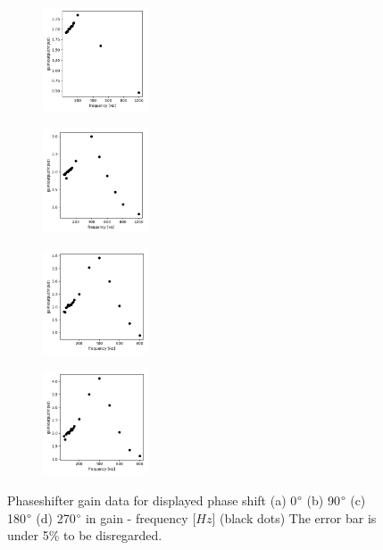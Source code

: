 \documentclass{article}
\begin{document}
\begin{figure}[H]
  \begin{subfigure}[b]{3.1cm}
      \centering
      \includegraphics[width=3.1cm]{../results/phaseshifter_gain_freq_plot(phase0).png}
      \caption{}
  \end{subfigure}
  \hfill
  \begin{subfigure}[b]{3.1cm}
    \centering
    \includegraphics[width=3.1cm]{../results/phaseshifter_gain_freq_plot(phase90).png}
    \caption{}
\end{subfigure}
\hfill
\begin{subfigure}[b]{3.1cm}
  \centering
  \includegraphics[width=3.1cm]{../results/phaseshifter_gain_freq_plot(phase180).png}
  \caption{}
\end{subfigure}
\hfill
\begin{subfigure}[b]{3.1cm}
  \centering
  \includegraphics[width=3.1cm]{../results/phaseshifter_gain_freq_plot(phase270).png}
  \caption{}
\end{subfigure}
\hfill
  \caption{Phaseshifter gain data for displayed phase shift (a) 0$\degree$ (b) 90$\degree$ (c) 180$\degree$ (d) 270$\degree$ in gain - frequency [$Hz$] (black dots)
      The error bar is under 5\% to be disregarded.
   }
  \label{fig: phaseshifter_gain_plot}
\end{figure}
\end{document}
